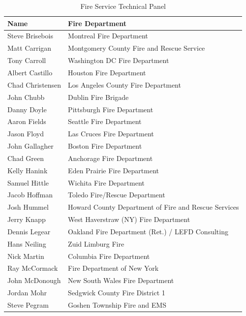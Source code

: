 \documentclass[12pt,oneside]{book}
\begin{document}
\begin{table}[!ht]
	\centering
	\caption*{Fire Service Technical Panel}
	\begin{tabular}{|l|l|}
		\hline
		Name & Fire Department \\ 
		\hline \hline
		Steve Brisebois  & Montreal Fire Department \\ \hline
		Matt Carrigan    & Montgomery County Fire and Rescue Service \\ \hline
		Tony Carroll     & Washington DC Fire Department \\ \hline
		Albert Castillo  & Houston Fire Department \\ \hline
		Chad Christensen & Los Angeles County Fire Department \\ \hline
		John Chubb       & Dublin Fire Brigade \\ \hline	 		  
		Danny Doyle      & Pittsburgh Fire Department \\ \hline
		Aaron Fields     & Seattle Fire Department \\ \hline
		Jason Floyd      & Las Cruces Fire Department \\ \hline
		John Gallagher   & Boston Fire Department \\ \hline
		Chad Green       & Anchorage Fire Department \\ \hline
		Kelly Hanink     & Eden Prairie Fire Department \\ \hline
		Samuel Hittle    & Wichita Fire Department \\ \hline
		Jacob Hoffman    & Toledo Fire/Rescue Department \\ \hline
		Josh Hummel      & Howard County Department of Fire and Rescue Services \\ \hline
		Jerry Knapp      & West Haverstraw (NY) Fire Department \\ \hline
		Dennis Legear    & Oakland Fire Department (Ret.) / LEFD Consulting \\ \hline
		Hans Neiling     & Zuid Limburg Fire \\ \hline
		Nick Martin      & Columbia Fire Department \\ \hline
		Ray McCormack    & Fire Department of New York \\ \hline
		John McDonough   & New South Wales Fire Department \\ \hline
		Jordan Mohr      & Sedgwick County Fire District 1 \\ \hline
		Steve Pegram     & Goshen Township Fire and EMS \\ \hline
	\end{tabular}
\end{table}
\end{document}
